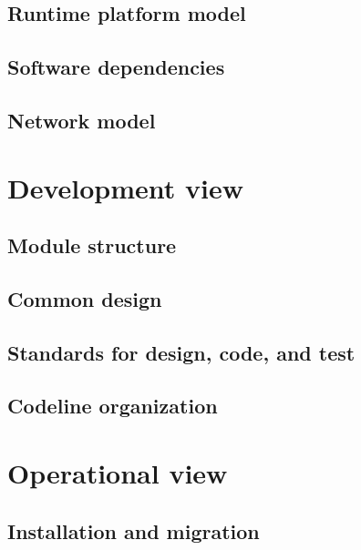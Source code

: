 \documentclass[a4paper,11pt]{report}
\begin{document}
\subsection{Runtime platform model}
\label{sec:runt-platf-model}



\subsection{Software dependencies}
\label{sec:softw-depend}


\subsection{Network model}
\label{sec:network-model}


\section{Development view}
\label{sec:development-view}


\subsection{Module structure}
\label{sec:module-structure}


\subsection{Common design}
\label{sec:common-design}


\subsection{Standards for design, code, and test}
\label{sec:stand-design-code}


\subsection{Codeline organization}
\label{sec:codel-organ}


\section{Operational view}
\label{sec:operational-view}

\subsection{Installation and migration}
\label{sec:inst-migr}
\end{document}

